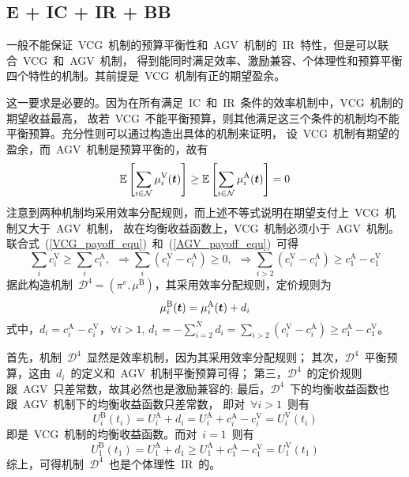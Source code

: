 \documentclass[a4paper,12pt]{article}
\newcommand{\mv}[1]{\mbox{\boldmath$#1$}}         %
\begin{document}
\subsection{E + IC  + IR + BB}

一般不能保证~VCG~机制的预算平衡性和~AGV~机制的~IR~特性，但是可以联合~VCG~和~AGV~机制，
得到能同时满足效率、激励兼容、个体理性和预算平衡四个特性的机制。其前提是~VCG~机制有正的期望盈余。

这一要求是必要的。因为在所有满足~IC~和~IR~条件的效率机制中，VCG~机制的期望收益最高，
故若~VCG~不能平衡预算，则其他满足这三个条件的机制均不能平衡预算。充分性则可以通过构造出具体的机制来证明，
设~VCG~机制有期望的盈余，而~AGV~机制是预算平衡的，故有
\begin{equation*}
    \mathbb{E}\left[\sum_{i\in\mathcal{N}}\mu_i^\mathrm{V}(\mv{t})\right] \ge
    \mathbb{E}\left[\sum_{i\in\mathcal{N}}\mu_i^\mathrm{A}(\mv{t})\right] = 0
\end{equation*}   
注意到两种机制均采用效率分配规则，而上述不等式说明在期望支付上~VCG~机制又大于~AGV~机制，
故在均衡收益函数上，VCG~机制必须小于~AGV~机制。联合式~(\ref{VCG_payoff_equ})~和~(\ref{AGV_payoff_equ})~可得
\begin{equation*}
    \sum_i c_i^\mathrm{V} \ge \sum_i c_i^\mathrm{A}, ~ ~ \Rightarrow \sum_i \left(c_i^\mathrm{V} - c_i^\mathrm{A} \right) \ge 0,
    ~ ~ \Rightarrow \sum_{i>2} \left(c_i^\mathrm{V} - c_i^\mathrm{A} \right) \ge c_1^\mathrm{A} - c_1^\mathrm{V}
\end{equation*} 
据此构造机制~$\mathcal{D}^4=(\pi^e,\mu^\mathrm{B})$，其采用效率分配规则，定价规则为
\begin{equation}
    \mu_i^\mathrm{B}(\mv{t}) = \mu_i^\mathrm{A}(\mv{t}) + d_i
\end{equation}
式中，$d_i = c_i^\mathrm{A} - c_i^\mathrm{V}$，$\forall i>1$, 
$d_1 = -\sum_{i=2}^N d_i = \sum_{i>2} \left(c_i^\mathrm{V} - c_i^\mathrm{A} \right) \ge c_1^\mathrm{A} - c_1^\mathrm{V}$。

首先，机制~$\mathcal{D}^4$~显然是效率机制，因为其采用效率分配规则；
其次，$\mathcal{D}^4$~平衡预算，这由~$d_i$~的定义和~AGV~机制平衡预算可得；
第三，$\mathcal{D}^4$~的定价规则跟~AGV~只差常数，故其必然也是激励兼容的;
最后，$\mathcal{D}^4$~下的均衡收益函数也跟~AGV~机制下的均衡收益函数只差常数，
即对~$\forall i>1$~则有
\begin{equation*}
    U_i^\mathrm{B}(t_i) = U_i^\mathrm{A} + d_i = U_i^\mathrm{A} + c_i^\mathrm{A} - c_i^\mathrm{V} = U_i^\mathrm{V}(t_i)
\end{equation*}   
即是~VCG~机制的均衡收益函数。而对~$i=1$~则有
\begin{equation*}
    U_1^\mathrm{B}(t_1) = U_1^\mathrm{A} + d_1 \ge U_1^\mathrm{A} + c_1^\mathrm{A} - c_1^\mathrm{V} = U_1^\mathrm{V}(t_1)
\end{equation*}   
综上，可得机制~$\mathcal{D}^4$~也是个体理性~IR~的。
\end{document}
